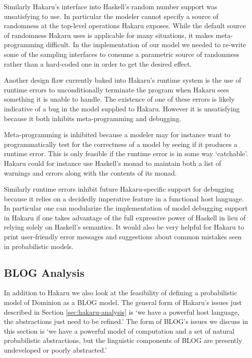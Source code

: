 Similarly Hakaru's interface into Haskell's random number support was
unsatisfying to use. In particular the modeler cannot specify a source
of randomness at the top-level operations Hakaru exposes. While the
default source of randomness Hakaru uses is applicable for many situations,
it makes meta-programming difficult. In the implementation of our model
we needed to re-write some of the sampling interfaces to consume a parametric
source of randomness rather than a hard-coded one in order to get the
desired effect.

Another design flaw currently baked into Hakaru's runtime system is the
use of runtime errors to unconditionally terminate the program when
Hakaru sees something it is unable to handle. The existence of
one of these errors is likely indicative of a bug in the model supplied
to Hakaru. However it is unsatisfying because it both inhibits
meta-programming and debugging.

Meta-programming is inhibited because a modeler may for instance want to
programmatically test for the correctness of a model by seeing if it
produces a runtime error. This is only feasible if the runtime error
is in some way `catchable'. Hakaru could for instance use Haskell's
 monad to maintain both a list of warnings and errors
along with the contents of its  monad.

Similarly runtime errors inhibit future Hakaru-specific support for
debugging because it relies on a decidedly imperative feature in a
functional host language. In particular one can modularize the implementation
of model debugging support in Hakaru if one takes advantage of the full
expressive power of Haskell in lieu of relying solely on Haskell's 
semantics. It would also be very helpful for Hakaru to print user-friendly
error messages and suggestions about common mistakes seen in probabilistic
models.

\subsection{BLOG Analysis} \label{sec:blog-analysis}

In addition to Hakaru we also look at the feasibility of defining a
probabilistic model of Dominion as a BLOG model. The general form
of Hakaru's issues just described in Section \ref{sec:hakaru-analysis}
is `we have a powerful host language, the abstractions
just need to be refined.' The form of BLOG's issues we discuss in this
section is `we have a powerful model of computation and a set of
natural probabilistic abstractions, but the linguistic components
of BLOG are presently undeveloped or poorly abstracted.'

